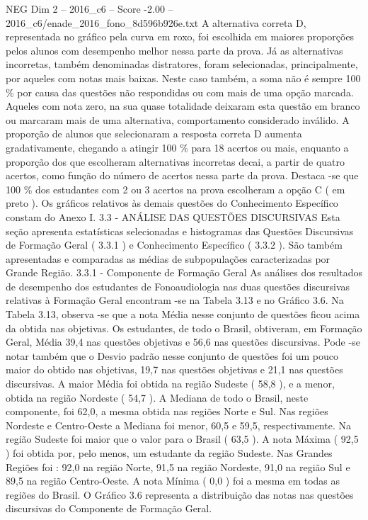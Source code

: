\begin{textsample}{NEG Dim 2 – 2016\_c6 – Score -2.00 – 2016\_c6/enade\_2016\_fono\_8d596b926e.txt}
A alternativa correta D, representada no gráfico pela curva em roxo, foi escolhida em maiores proporções pelos alunos com desempenho melhor nessa parte da prova.
Já as alternativas incorretas, também denominadas distratores, foram selecionadas, principalmente, por aqueles com notas mais baixas.
Neste caso também, a soma não é sempre 100 \% por causa das questões não respondidas ou com mais de uma opção marcada.
Aqueles com nota zero, na sua quase totalidade deixaram esta questão em branco ou marcaram mais de uma alternativa, comportamento considerado inválido.
A proporção de alunos que selecionaram a resposta correta D aumenta gradativamente, chegando a atingir 100 \% para 18 acertos ou mais, enquanto a proporção dos que escolheram alternativas incorretas decai, a partir de quatro acertos, como função do número de acertos nessa parte da prova.
Destaca -se que 100 \% dos estudantes com 2 ou 3 acertos na prova escolheram a opção C ( em preto ).
Os gráficos relativos às demais questões do Conhecimento Específico constam do Anexo I. 3.3 - ANÁLISE DAS QUESTÕES DISCURSIVAS Esta seção apresenta estatísticas selecionadas e histogramas das Questões Discursivas de Formação Geral ( 3.3.1 ) e Conhecimento Específico ( 3.3.2 ).
São também apresentadas e comparadas as médias de subpopulações caracterizadas por Grande Região. 3.3.1 - Componente de Formação Geral As análises dos resultados de desempenho dos estudantes de Fonoaudiologia nas duas questões discursivas relativas à Formação Geral encontram -se na Tabela 3.13 e no Gráfico 3.6.
Na Tabela 3.13, observa -se que a nota Média nesse conjunto de questões ficou acima da obtida nas objetivas.
Os estudantes, de todo o Brasil, obtiveram, em Formação Geral, Média 39,4 nas questões objetivas e 56,6 nas questões discursivas.
Pode -se notar também que o Desvio padrão nesse conjunto de questões foi um pouco maior do obtido nas objetivas, 19,7 nas questões objetivas e 21,1 nas questões discursivas.
A maior Média foi obtida na região Sudeste ( 58,8 ), e a menor, obtida na região Nordeste ( 54,7 ).
A Mediana de todo o Brasil, neste componente, foi 62,0, a mesma obtida nas regiões Norte e Sul.
Nas regiões Nordeste e Centro-Oeste a Mediana foi menor, 60,5 e 59,5, respectivamente.
Na região Sudeste foi maior que o valor para o Brasil ( 63,5 ).
A nota Máxima ( 92,5 ) foi obtida por, pelo menos, um estudante da região Sudeste.
Nas Grandes Regiões foi : 92,0 na região Norte, 91,5 na região Nordeste, 91,0 na região Sul e 89,5 na região Centro-Oeste.
A nota Mínima ( 0,0 ) foi a mesma em todas as regiões do Brasil.
O Gráfico 3.6 representa a distribuição das notas nas questões discursivas do Componente de Formação Geral.

\end{textsample}
